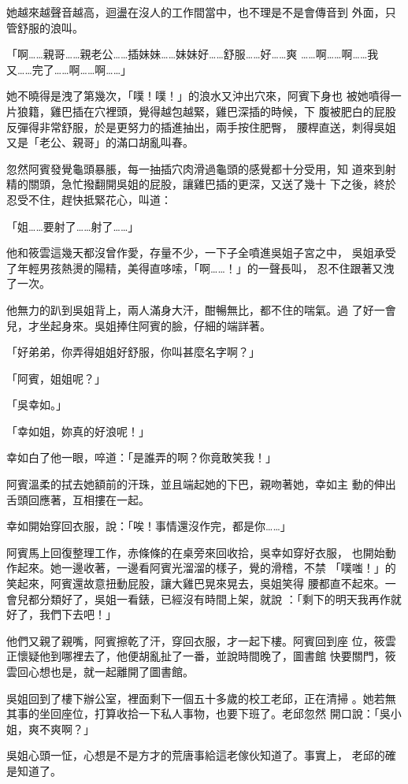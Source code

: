 她越來越聲音越高，迴盪在沒人的工作間當中，也不理是不是會傳音到
外面，只管舒服的浪叫。

「啊……親哥……親老公……插妹妹……妹妹好……舒服……好……爽
……啊……啊……我又……完了……啊……啊……」

她不曉得是洩了第幾次，「噗！噗！」的浪水又沖出穴來，阿賓下身也
被她噴得一片狼籍，雞巴插在穴裡頭，覺得越包越緊，雞巴深插的時候，下
腹被肥白的屁股反彈得非常舒服，於是更努力的插進抽出，兩手按住肥臀，
腰桿直送，刺得吳姐又是「老公、親哥」的滿口胡亂叫春。

忽然阿賓發覺龜頭暴脹，每一抽插穴肉滑過龜頭的感覺都十分受用，知
道來到射精的關頭，急忙撥翻開吳姐的屁股，讓雞巴插的更深，又送了幾十
下之後，終於忍受不住，趕快抵緊花心，叫道：

「姐……要射了……射了……」

他和筱雲這幾天都沒曾作愛，存量不少，一下子全噴進吳姐子宮之中，
吳姐承受了年輕男孩熱燙的陽精，美得直哆嗦，「啊……！」的一聲長叫，
忍不住跟著又洩了一次。

他無力的趴到吳姐背上，兩人滿身大汗，酣暢無比，都不住的喘氣。過
了好一會兒，才坐起身來。吳姐捧住阿賓的臉，仔細的端詳著。

「好弟弟，你弄得姐姐好舒服，你叫甚麼名字啊？」

「阿賓，姐姐呢？」

「吳幸如。」

「幸如姐，妳真的好浪呢！」

幸如白了他一眼，啐道：「是誰弄的啊？你竟敢笑我！」

阿賓溫柔的拭去她額前的汗珠，並且端起她的下巴，親吻著她，幸如主
動的伸出舌頭回應著，互相摟在一起。

幸如開始穿回衣服，說：「唉！事情還沒作完，都是你……」

阿賓馬上回復整理工作，赤條條的在桌旁來回收拾，吳幸如穿好衣服，
也開始動作起來。她一邊收著，一邊看阿賓光溜溜的樣子，覺的滑稽，不禁
「噗嗤！」的笑起來，阿賓還故意扭動屁股，讓大雞巴晃來晃去，吳姐笑得
腰都直不起來。一會兒都分類好了，吳姐一看錶，已經沒有時間上架，就說
：「剩下的明天我再作就好了，我們下去吧！」

他們又親了親嘴，阿賓擦乾了汗，穿回衣服，才一起下樓。阿賓回到座
位，筱雲正懷疑他到哪裡去了，他便胡亂扯了一番，並說時間晚了，圖書館
快要關門，筱雲回心想也是，就一起離開了圖書館。

吳姐回到了樓下辦公室，裡面剩下一個五十多歲的校工老邱，正在清掃
。她若無其事的坐回座位，打算收拾一下私人事物，也要下班了。老邱忽然
開口說：「吳小姐，爽不爽啊？」

吳姐心頭一怔，心想是不是方才的荒唐事給這老傢伙知道了。事實上，
老邱的確是知道了。

